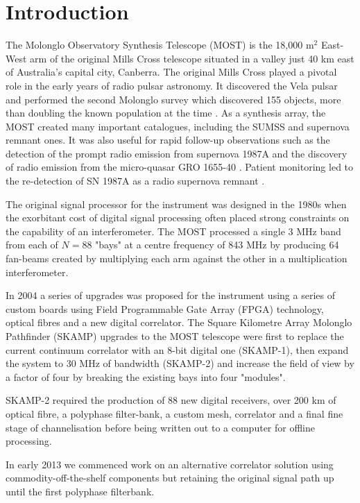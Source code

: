 \section{Introduction} 
The Molonglo Observatory Synthesis Telescope (MOST) is the 18,000 m$^2$ East-West arm of the original Mills Cross telescope situated in a valley just 40 km east of Australia's capital city, Canberra. The original Mills Cross played a pivotal role in the early years of radio pulsar astronomy. It discovered the Vela pulsar \cite{LARGE_1968} and performed the second Molonglo survey which discovered 155 objects, more than doubling the known population at the time \cite{Manchester_1978}. As a synthesis array, the MOST created many important catalogues, including the SUMSS \cite{Bock_1999,Mauch_2003} and supernova remnant \cite{Whiteoak_1996} ones. It was also useful for rapid follow-up observations such as the detection of the prompt radio emission from supernova 1987A \cite{Turtle_1987} and the discovery of radio emission from the micro-quasar GRO 1655-40 \cite{Tingay_1995}. Patient monitoring led to the re-detection of SN 1987A as a radio supernova remnant \cite{Staveley_Smith_1992}.

The original signal processor for the instrument \cite{Robertson_1991} was designed in the 1980s when the exorbitant cost of digital signal processing often placed strong constraints on the capability of an interferometer. The MOST processed a single 3 MHz band from each of $N=88$ "bays" at a centre frequency of 843 MHz by producing 64 fan-beams created by multiplying each arm against the other in a multiplication interferometer. 

In 2004 a series of upgrades was proposed for the instrument using a series of custom boards using Field Programmable Gate Array (FPGA) technology, optical fibres and a new digital correlator\cite{Adams_2004}. The Square Kilometre Array Molonglo Pathfinder (SKAMP) upgrades to the MOST telescope were first to replace the current continuum correlator with an 8-bit digital one (SKAMP-1), then expand the system to 30 MHz of bandwidth (SKAMP-2) and increase the field of view by a factor of four by breaking the existing bays into four "modules".

SKAMP-2 required the production of 88 new digital receivers, over 200 km of optical fibre, a polyphase filter-bank, a custom mesh, correlator and a final fine stage of channelisation before being written out to a computer for offline processing.

In early 2013 we commenced work on an alternative correlator solution using commodity-off-the-shelf components but retaining the original signal path up until the first polyphase filterbank. 

